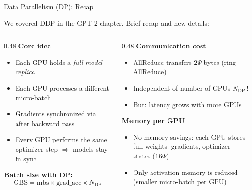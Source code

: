 
\begin{frame}{Data Parallelism (DP): Recap}

  We covered DDP in the GPT-2 chapter. Brief recap and new details:

  \vspace{0.3em}
  \begin{columns}
    \begin{column}{0.48\textwidth}
      \textbf{Core idea}
      \begin{itemize}
        \item Each GPU holds a \emph{full model replica}
        \item Each GPU processes a different micro-batch
        \item Gradients synchronized via  after backward pass
        \item Every GPU performs the same optimizer step $\Rightarrow$ models stay in sync
      \end{itemize}

      \vspace{0.5em}
      \textbf{Batch size with DP:}
      \[
        \text{GBS} = \text{mbs} \times \text{grad\_acc} \times N_{\text{DP}}
      \]
    \end{column}
    \begin{column}{0.48\textwidth}
      \textbf{Communication cost}
      \begin{itemize}
        \item AllReduce transfers $2\Psi$ bytes (ring AllReduce)
        \item Independent of number of GPUs $N_{\text{DP}}$\,!
        \item But: latency grows with more GPUs
      \end{itemize}

      \vspace{0.5em}
      \textbf{Memory per GPU}
      \begin{itemize}
        \item No memory savings: each GPU stores full weights, gradients, optimizer states ($16\Psi$)
        \item Only activation memory is reduced (smaller micro-batch per GPU)
      \end{itemize}
    \end{column}
  \end{columns}
\end{frame}

